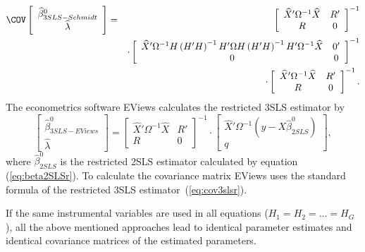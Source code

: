 \begin{eqnarray}
   \COV
   \left[ \begin{array}{c}
      \widehat{\beta}^0_{3SLS-Schmidt} \\ \widehat{\lambda}
   \end{array} \right] 
   & = & 
   \left[ \begin{array}{cc}
      \widehat{X}' \Omega^{-1} \widehat{X} & R' \\ 
      R & 0
   \end{array} \right]^{-1}
   \\
   & & \cdot
   \left[ \begin{array}{cc}
      \widehat{X}' \Omega^{-1} H \left( H' H \right)^{-1} H' \Omega
      H \left( H' H \right)^{-1} H' \Omega^{-1} \widehat{X} & 0' \\ 
      0 & 0
   \end{array} \right]^{-1}
   \nonumber \\
   & & \cdot
   \left[ \begin{array}{cc}
      \widehat{X}' \Omega^{-1} \widehat{X} & R' \\ 
      R & 0
   \end{array} \right]^{-1} .
   \nonumber
\end{eqnarray}
The econometrics software EViews calculates the restricted 3SLS estimator by
\begin{equation}
   \left[ \begin{array}{c}
      \widehat{\beta}^0_{3SLS-EViews} \\ \widehat{\lambda}
   \end{array} \right]
   =
   \left[ \begin{array}{cc}
      \widehat{X}' \Omega^{-1} \widehat{X} & R' \\ 
      R & 0
   \end{array} \right]^{-1}
   \cdot
   \left[ \begin{array}{c}
      \widehat{X}' \Omega^{-1} \left( y - X \widehat{\beta}^0_{2SLS} \right)
      \\ q 
   \end{array} \right] ,
   \label{eq:3slsEViewsR}
\end{equation}
where $\widehat{\beta}^0_{2SLS}$ is the restricted 2SLS estimator calculated
by equation (\ref{eq:beta2SLSr}). 
To calculate the covariance matrix
EViews uses the standard formula of the restricted 3SLS
estimator~(\ref{eq:cov3slsr}).


If the same instrumental variables are used in all equations 
($H_1 = H_2 = \ldots = H_G$), 
all the above mentioned approaches lead to identical parameter estimates
and identical covariance matrices of the estimated parameters.

